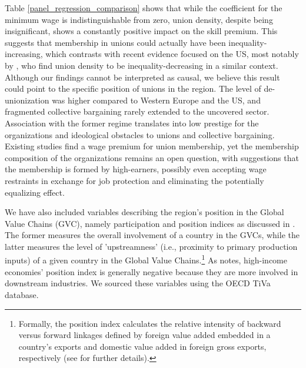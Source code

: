 \documentclass[11pt]{article}
\begin{document}
Table \ref{panel_regression_comparison} shows that while the coefficient for the minimum wage is indistinguishable from zero, union density, despite being insignificant, shows a constantly positive impact on the skill premium. This suggests that membership in unions could actually have been inequality-increasing, which contrasts with recent evidence focused on the US, most notably by \citet{farber2021unions}, who find union density to be inequality-decreasing in a similar context. Although our findings cannot be interpreted as causal, we believe this result could point to the specific position of unions in the region. The level of de-unionization was higher compared to Western Europe and the US, and fragmented collective bargaining rarely extended to the uncovered sector. Association with the former regime translates into low prestige for the organizations and ideological obstacles to unions and collective bargaining. Existing studies find a wage premium for union membership, yet the membership composition of the organizations remains an open question, with suggestions that the membership is formed by high-earners, possibly even accepting wage restraints in exchange for job protection \citep{magda2017trade} and eliminating the potentially equalizing effect.%

We have also included variables describing the region's position in the Global Value Chains (GVC), namely participation and position indices as discussed in \citet{coveri2024global}. The former measures the overall involvement of a country in the GVCs, while the latter measures the level of 'upstreamness' (i.e., proximity to primary production inputs) of a given country in the Global Value Chains.\footnote{Formally, the position index calculates the relative intensity of backward versus forward linkages defined by foreign value added embedded in a country's exports and domestic value added in foreign gross exports, respectively (see \cite{coveri2024global} for further details).} As \cite{coveri2024global} notes, high-income economies' position index is generally negative because they are more involved in downstream industries. We sourced these variables using the OECD TiVa database.
\end{document}

